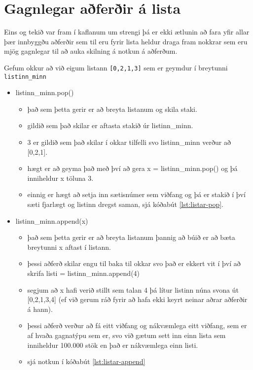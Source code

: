 \section{Gagnlegar aðferðir á lista}\label{uk:aðferðir-listar}

Eins og tekið var fram í kaflanum um strengi þá er ekki ætlunin að fara yfir allar þær innbyggðu aðferðir sem til eru fyrir lista heldur draga fram nokkrar sem eru mjög gagnlegar til að auka skilning á notkun á aðferðum.

Gefum okkur að við eigum listann \texttt{[0,2,1,3]} sem er geymdur í breytunni \texttt{listinn\_minn}

\begin{itemize}
	\item listinn\_minn.pop() 
	\begin{itemize}
		\item það sem þetta gerir er að breyta listanum og skila staki.
		\item gildið sem það skilar er aftasta stakið úr listinn\_minn.
		\item 3 er gildið sem það skilar í okkar tilfelli svo listinn\_minn verður að [0,2,1].
		\item hægt er að geyma það með því að gera x = listinn\_minn.pop() og þá inniheldur x töluna 3.
		\item einnig er hægt að setja inn sætisnúmer sem viðfang og þá er stakið í því sæti fjarlægt og listinn dregst saman, sjá kóðabút \ref{lst:listar-pop}.
	\end{itemize}
	\item listinn\_minn.append(x)
	\begin{itemize}
		\item það sem þetta gerir er að breyta listanum þannig að búið er að bæta breytunni x aftast í listann.
		\item þessi aðferð skilar engu til baka til okkar svo það er ekkert vit í því að skrifa listi = listinn\_minn.append(4)
		\item segjum að x hafi verið stillt sem talan 4 þá lítur listinn núna svona út [0,2,1,3,4] (ef við gerum ráð fyrir að hafa ekki keyrt neinar aðrar aðferðir á hann).
		\item þessi aðferð verður að fá eitt viðfang og nákvæmlega eitt viðfang, sem er af hvaða gagnatýpu sem er, svo við gætum sett inn einn lista sem inniheldur 100.000 stök en það er nákvæmlega einn listi.
		\item sjá notkun í kóðabút \ref{lst:listar-append}
	\end{itemize}

\end{itemize}
